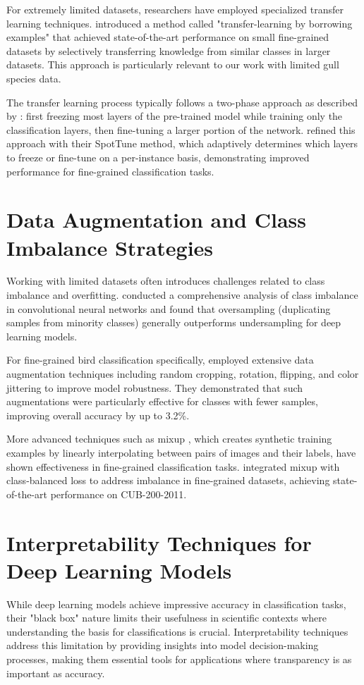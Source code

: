 \documentclass[a4paper,12pt]{report}
\begin{document}
For extremely limited datasets, researchers have employed specialized transfer learning techniques. \citep{cui2018large} introduced a method called "transfer-learning by borrowing examples" that achieved state-of-the-art performance on small fine-grained datasets by selectively transferring knowledge from similar classes in larger datasets. This approach is particularly relevant to our work with limited gull species data.

The transfer learning process typically follows a two-phase approach as described by \citep{sharif2014cnn}: first freezing most layers of the pre-trained model while training only the classification layers, then fine-tuning a larger portion of the network. \citep{guo2019spottune} refined this approach with their SpotTune method, which adaptively determines which layers to freeze or fine-tune on a per-instance basis, demonstrating improved performance for fine-grained classification tasks.


\section*{Data Augmentation and Class Imbalance Strategies}
Working with limited datasets often introduces challenges related to class imbalance and overfitting. \citep{buda2018systematic} conducted a comprehensive analysis of class imbalance in convolutional neural networks and found that oversampling (duplicating samples from minority classes) generally outperforms undersampling for deep learning models.

For fine-grained bird classification specifically, \citep{chu2020fine} employed extensive data augmentation techniques including random cropping, rotation, flipping, and color jittering to improve model robustness. They demonstrated that such augmentations were particularly effective for classes with fewer samples, improving overall accuracy by up to 3.2\%.

More advanced techniques such as mixup \citep{zhang2018mixup}, which creates synthetic training examples by linearly interpolating between pairs of images and their labels, have shown effectiveness in fine-grained classification tasks. \citep{cui2019class} integrated mixup with class-balanced loss to address imbalance in fine-grained datasets, achieving state-of-the-art performance on CUB-200-2011.


\section*{Interpretability Techniques for Deep Learning Models}
While deep learning models achieve impressive accuracy in classification tasks, their "black box" nature limits their usefulness in scientific contexts where understanding the basis for classifications is crucial. Interpretability techniques address this limitation by providing insights into model decision-making processes, making them essential tools for applications where transparency is as important as accuracy.
\end{document}
